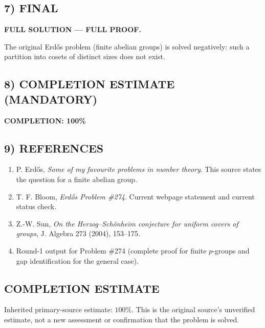 \subsection*{7) FINAL}

\textbf{FULL SOLUTION --- FULL PROOF.}

The original Erd\H{o}s problem (finite abelian groups) is solved negatively: such a partition into cosets of distinct sizes does not exist.

\subsection*{8) COMPLETION ESTIMATE (MANDATORY)}

\textbf{COMPLETION: 100\%}

\subsection*{9) REFERENCES}

\begin{enumerate}
\item P. Erd\H{o}s, \emph{Some of my favourite problems in number theory}.  This source states the question for a finite abelian group.
\item T. F. Bloom, \emph{Erd\H{o}s Problem \#274}.  Current webpage statement and current status check.
\item Z.-W. Sun, \emph{On the Herzog--Sch\"onheim conjecture for uniform covers of groups}, J. Algebra 273 (2004), 153--175.
\item Round-1 output for Problem \#274 (complete proof for finite $p$-groups and gap identification for the general case).
\end{enumerate}





\subsection*{COMPLETION ESTIMATE}
Inherited primary-source estimate: $100\%$. This is the original source's unverified estimate, not a new assessment or confirmation that the problem is solved.
